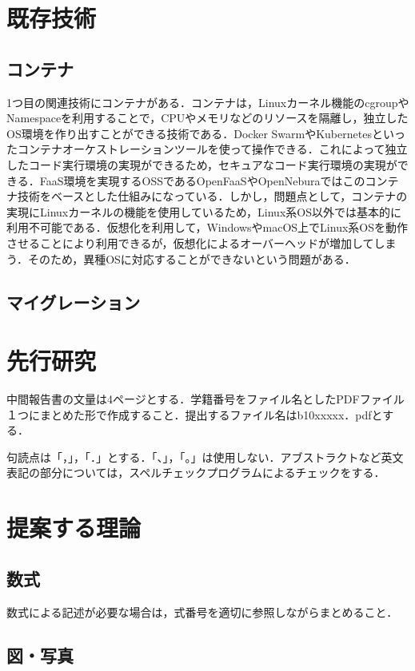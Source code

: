 \documentclass[11pt]{ujarticle} %
\begin{document}
\section{既存技術}
\subsection{コンテナ}
1つ目の関連技術にコンテナがある．コンテナは，Linuxカーネル機能のcgroupやNamespaceを利用することで，CPUやメモリなどのリソースを隔離し，独立したOS環境を作り出すことができる技術である．Docker SwarmやKubernetesといったコンテナオーケストレーションツールを使って操作できる．これによって独立したコード実行環境の実現ができるため，セキュアなコード実行環境の実現ができる．FaaS環境を実現するOSSであるOpenFaaSやOpenNeburaではこのコンテナ技術をベースとした仕組みになっている．しかし，問題点として，コンテナの実現にLinuxカーネルの機能を使用しているため，Linux系OS以外では基本的に利用不可能である．仮想化を利用して，WindowsやmacOS上でLinux系OSを動作させることにより利用できるが，仮想化によるオーバーヘッドが増加してしまう．そのため，異種OSに対応することができないという問題がある．

\subsection{マイグレーション}


\section{先行研究}

中間報告書の文量は4ページとする．学籍番号をファイル名としたPDFファイル１つにまとめた形で作成すること．提出するファイル名はb10xxxxx．pdfとする．

句読点は「，」，「．」とする．「、」，「。」は使用しない．アブストラクトなど英文表記の部分については，スペルチェックプログラムによるチェックをする．

\section{提案する理論}

\subsection{数式}

数式による記述が必要な場合は，式番号を適切に参照しながらまとめること．

\subsection{図・写真}
\end{document}
